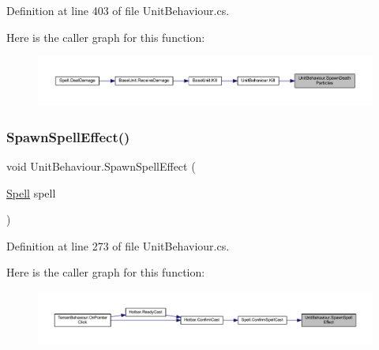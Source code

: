 Definition at line 403 of file Unit\+Behaviour.\+cs.

Here is the caller graph for this function\+:
\nopagebreak
\begin{figure}[H]
\begin{center}
\leavevmode
\includegraphics[width=350pt]{class_unit_behaviour_a17b46e508ee650f487d4bf79608da4eb_icgraph}
\end{center}
\end{figure}
\mbox{\label{class_unit_behaviour_a558929aaa9173e1a3b9dfecd8674660f}} 
\subsubsection{\texorpdfstring{SpawnSpellEffect()}{SpawnSpellEffect()}}
{\footnotesize\ttfamily void Unit\+Behaviour.\+Spawn\+Spell\+Effect (\begin{DoxyParamCaption}\item[{\mbox{\hyperlink{class_spell}{Spell}}}]{spell }\end{DoxyParamCaption})}



Definition at line 273 of file Unit\+Behaviour.\+cs.

Here is the caller graph for this function\+:
\nopagebreak
\begin{figure}[H]
\begin{center}
\leavevmode
\includegraphics[width=350pt]{class_unit_behaviour_a558929aaa9173e1a3b9dfecd8674660f_icgraph}
\end{center}
\end{figure}
\mbox{\label{class_unit_behaviour_a2eee29cede96c8d2aa45e89eda7c0c3c}} 
